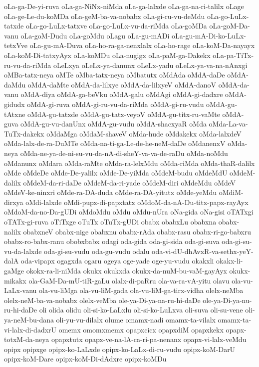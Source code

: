 {oLa-ga-De-yi-ruva
oLa-ga-NiNx-niMda
oLa-ga-lalxde
oLa-ga-na-ri-talilx
oLage
oLa-ge-Le-du-koMDa
oLa-geM-ba-va-nobabx
oLa-gi-ru-vu-deMdu
oLa-go-LuLx-tatxde
oLa-go-LuLx-tatxve
oLa-go-LuLx-vu-da-riMda
oLa-goMDa
oLa-goM-Da-vanu
oLa-goM-Dudu
oLa-goMdu
oLagu
oLa-gu-mADi
oLa-gu-mA-Di-ko-LuLx-tetxVve
oLa-gu-mA-Duva
oLa-ho-ra-ga-nenxlalx
oLa-ho-rage
oLa-koM-Da-nayayx
oLa-koM-Di-tatxyAyx
oLa-koMDu
oLa-nugigx
oLa-paM-ga-Dakekx
oLa-pa-TiTx-ru-vu-da-riMda
oLeLxya
oLeLx-ya-danunx
oLeLx-yadu
oLeLx-ya-va-na-nAnxgi
oMBa-tatx-neya
oMTe
oMba-tatx-neya
oMbatutx
oMdAda
oMdA-daDe
oMdA-daMdu
oMdA-daMte
oMdA-da-lilxye
oMdA-da-lilxyeV
oMdA-danoV
oMdA-da-vanu
oMdA-diya
oMdA-ga-beVku
oMdA-galu
oMdAgi
oMdA-gi-dadxre
oMdA-gidudx
oMdA-gi-ruva
oMdA-gi-ru-vu-da-riMda
oMdA-gi-ru-vudu
oMdA-gu-tAtxne
oMdA-gu-tatxde
oMdA-gu-tatx-veyoV
oMdA-gu-titx-ru-vaMte
oMdA-guva
oMdA-gu-vu-danUnx
oMdA-gu-vudu
oMdA-shacxyaR
oMda
oMda-La-va-TuTx-dakekx
oMdaMga
oMdaM-shaveV
oMda-hude
oMdakekx
oMda-lalxdeV
oMda-lalx-de-ra-DuMTe
oMda-na-ti-ga-Le-de-he-neM-daDe
oMdanenxV
oMda-neya
oMda-ne-ya-de-ni-su-vu-da-nA-di-sheY-va-va-de-raDu
oMda-noMdu
oMdanunx
oMdara
oMda-raMte
oMda-ra-lelxMdu
oMda-riMda
oMda-thaR-dalilx
oMde
oMdeDe
oMde-De-yalilx
oMde-De-yiMda
oMdeM-budu
oMdeMdU
oMdeM-dalilx
oMdeM-da-ri-daDe
oMdeM-da-ri-yade
oMdeM-diri
oMdeMdu
oMdeV
oMdeV-ke-ninxri
oMde-ra-DA-duda
oMde-ra-DA-yitutx
oMde-yeMdu
oMdiM-dirxya
oMdi-lalxde
oMdi-pupx-di-papxtatx
oMdoM-da-nA-Du-titx-papx-rayAyx
oMdoM-da-no-Da-gUDi
oMdoMdu
oMdu
oMdu-nUra
oNa-gida
oNa-gisi
oTATxgi
oTATx-gi-ruva
oTiTxge
oTuTx
oTuTx-gUDi
obabx
obabxLu
obabxna
obabx-nalilx
obabxneV
obabx-nige
obabxnu
obabx-rAda
obabx-rasu
obabx-ri-go-babxru
obabx-ro-babx-ranu
obobxbabx
odagi
oda-gida
oda-gi-sida
oda-gi-suva
oda-gi-su-vu-da-lalxde
oda-gi-su-vudu
oda-gu-vudu
odalu
oda-vi-dU-dhAvxR-va-sethx-yeY-dalA
oda-vipapx
ogagxda
ogaru
ogeya
oge-yade
oge-yu-vudu
okakxli
okakx-li-gaMge
okokx-ra-li-niMda
okukx
okukxda
okukx-da-nuM-bu-vaM-gayAyx
okukx-mikakx
ola-GaM-Da-mU-tiR-gaLu
olalx-di-paRru
ola-va-ra-vA-yitu
olavu
ola-vu-LaLx-vanu
ola-vu-liMga
ola-vu-liM-gada
ola-vu-liM-ga-tirx-vidha
olelx-neMba
olelx-neM-ba-va-nobabx
olelx-veMba
ole-ya-Di-ya-na-ru-hi-daDe
ole-ya-Di-ya-nu-ru-hi-daDe
oli
olida
olidu
oli-si-ko-LaLxlu
oli-si-ko-LuLxva
oli-suva
oli-su-vene
oli-ya-neM-bu-dana
oli-yu-vu-dilalx
olume
omamx-nadi
omamx-ta-vilalx
omamx-ta-vi-lalx-di-dadxrU
omemx
omomxmemx
opapxcicx
opapxdiM
opapxkekx
opapx-totxM-da-neya
opapxtutx
opapx-ve-na-lA-ca-ri-pa-nenanx
opapx-vi-lalx-veMdu
opipx
opipxge
opipx-ko-LaLxde
opipx-ko-LaLx-di-ru-vudu
opipx-koM-DarU
opipx-koM-Dare
opipx-koM-Di-dAdxre
opipx-koMDu
}
